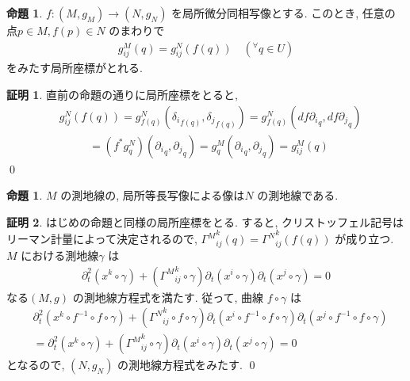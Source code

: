 \documentclass[twocolumn, landscape, a4paper , 8pt, fleqn, titlepage ]{jsarticle}
\theoremstyle{definition}
\newtheorem{prop}[dfn]{命題}
\newtheorem*{pf*}{証明}
\newcommand{\any}{{}^{\forall}}
\begin{document}
\begin{prop}
$f: (M,g_M) \rightarrow (N,g_N)$ を局所微分同相写像とする. このとき, 任意の点$p \in M, f(p) \in N$ のまわりで  
\begin{align*} g^M_{ij}(q) = g^N_{ij}(f(q)) \quad (\any q \in U) \end{align*}
をみたす局所座標がとれる. 
\end{prop}
\begin{pf*}
直前の命題の通りに局所座標をとると, 
\begin{align*} &g^N_{ij}( f(q) ) = g^N_{f(q)} ({\delta_i}_{f(q)}, { \delta_j}_{f(q)}  ) = g^N_{f(q)} ({df \partial_i}_{q}, {df \partial_j}_{q}  ) \\&\hspace{32pt} = (f^* g^N_q ) ({\partial_i}_q, {\partial_j}_q) =   g^M _q  ({\partial_i}_q, {\partial_j}_q) = g^M _{ij} (q) \end{align*}
\qed
\end{pf*}



\begin{prop}
$M$ の測地線の, 局所等長写像による像は$N$ の測地線である.
\end{prop}
\begin{pf*}
はじめの命題と同様の局所座標をとる. すると, クリストッフェル記号はリーマン計量によって決定されるので, ${\Gamma^ M }_{ij}^k (q) = {\Gamma^N }_{ij}^k (f(q)) $ が成り立つ. $M$ における測地線$\gamma $ は
\begin{align*} \partial_t ^2 (x^k \circ \gamma) + ({\Gamma^M} _{ij}^k \circ \gamma) \partial_t (x^i \circ \gamma) \partial_t (x^j \circ \gamma) = 0\end{align*}
なる$(M,g)$ の測地線方程式を満たす. 従って, 曲線 $f \circ \gamma$ は
\begin{align*}  &\partial_t ^2 (x^k \circ f^{-1} \circ f \circ \gamma) + ({\Gamma^N}_{ij}^k \circ f \circ  \gamma) \partial_t (x^i \circ f^{-1} \circ f \circ\gamma) \partial_t (x^j \circ f^{-1} \circ f \circ \gamma) \\&= \partial_t ^2 (x^k \circ \gamma) + ({\Gamma^M}_{ij}^k  \circ \gamma) \partial_t (x^i \circ \gamma) \partial_t (x^j \circ \gamma) = 0    \end{align*}
となるので, $(N, g_N)$ の測地線方程式をみたす. 
\qed
\end{pf*}
\end{document}
